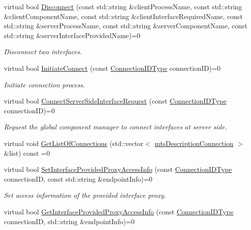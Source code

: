 \begin{DoxyCompactItemize}
virtual bool \hyperlink{classmts_manager_global_interface_a634c44151f8ef120526bc2be0cc3eb9a}{Disconnect} (const std\+::string \&client\+Process\+Name, const std\+::string \&client\+Component\+Name, const std\+::string \&client\+Interface\+Required\+Name, const std\+::string \&server\+Process\+Name, const std\+::string \&server\+Component\+Name, const std\+::string \&server\+Interface\+Provided\+Name)=0
\begin{DoxyCompactList}\small\item\em Disconnect two interfaces. \end{DoxyCompactList}\item 
virtual bool \hyperlink{classmts_manager_global_interface_aa9e2d02acd143d1a3ec7b7cc50c394ef}{Initiate\+Connect} (const \hyperlink{mts_forward_declarations_8h_ad3543bb11742e1766374ec96016d6547}{Connection\+I\+D\+Type} connection\+I\+D)=0
\begin{DoxyCompactList}\small\item\em Initiate connection process. \end{DoxyCompactList}\item 
virtual bool \hyperlink{classmts_manager_global_interface_a997fe786b674ece0eaf077040f170e08}{Connect\+Server\+Side\+Interface\+Request} (const \hyperlink{mts_forward_declarations_8h_ad3543bb11742e1766374ec96016d6547}{Connection\+I\+D\+Type} connection\+I\+D)=0
\begin{DoxyCompactList}\small\item\em Request the global component manager to connect interfaces at server side. \end{DoxyCompactList}\item 
virtual void \hyperlink{classmts_manager_global_interface_a95665a4a3b83ac9ca2e0e883832f657c}{Get\+List\+Of\+Connections} (std\+::vector$<$ \hyperlink{classmts_description_connection}{mts\+Description\+Connection} $>$ \&list) const =0
\item 
virtual bool \hyperlink{classmts_manager_global_interface_a40dab0f138d6305055bda1ce2f852f6e}{Set\+Interface\+Provided\+Proxy\+Access\+Info} (const \hyperlink{mts_forward_declarations_8h_ad3543bb11742e1766374ec96016d6547}{Connection\+I\+D\+Type} connection\+I\+D, const std\+::string \&endpoint\+Info)=0
\begin{DoxyCompactList}\small\item\em Set access information of the provided interface proxy. \end{DoxyCompactList}\item 
virtual bool \hyperlink{classmts_manager_global_interface_ade5d23408244c8bbecec7809419676c6}{Get\+Interface\+Provided\+Proxy\+Access\+Info} (const \hyperlink{mts_forward_declarations_8h_ad3543bb11742e1766374ec96016d6547}{Connection\+I\+D\+Type} connection\+I\+D, std\+::string \&endpoint\+Info)=0

\end{DoxyCompactItemize}
